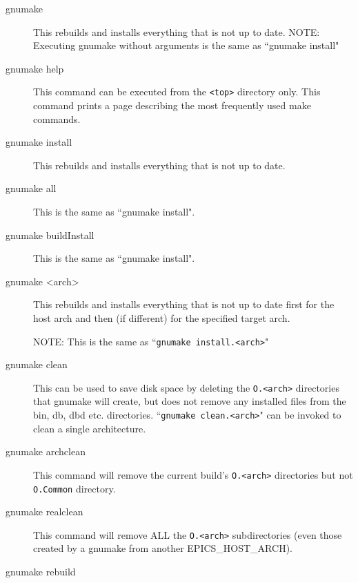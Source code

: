 \begin{description}

\item[gnumake] This rebuilds and installs everything that is not up to date.
NOTE: Executing gnumake without arguments is the same as ``gnumake install"

\item [gnumake help] This command can be executed from the \verb|<top>| directory only. This command prints a page describing the most 
frequently used make commands.

\item[gnumake install]

This rebuilds and installs everything that is not up to date.

\item[gnumake all]

This is the same as ``gnumake install".

\item[gnumake buildInstall]

This is the same as ``gnumake install".

\item[gnumake \textless{}arch\textgreater{}]

This rebuilds and installs everything that is not up to date first for the host arch and then (if different) for the 
specified target arch.

NOTE: This is the same as ``\verb|gnumake install.<arch>|"

\item[gnumake clean]  

This can be used to save disk space by deleting the \verb|O.<arch>| directories that gnumake will create, but does not remove any installed files from the bin, db, dbd etc. directories. ``\verb|gnumake clean.<arch>|" can be invoked to clean a single architecture.

\item[gnumake archclean]  

This command will remove the current build's \verb|O.<arch>| directories but not \verb|O.Common| directory.

\item[gnumake realclean]  

This command will remove ALL the \verb|O.<arch>| subdirectories (even those created by a gnumake from another 
EPICS\_HOST\_ARCH).

\item[gnumake rebuild]  


\end{description}
